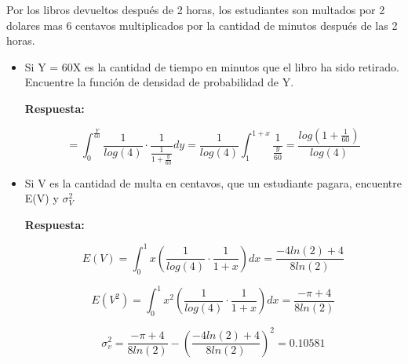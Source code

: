 \documentclass{article}\usepackage[]{graphicx}\usepackage[]{color}
\begin{document}
Por los libros devueltos después de 2 horas, los estudiantes son multados por 2 dolares mas 6 centavos multiplicados por la cantidad de minutos después de las 2 horas.
\begin{itemize}
\item Si Y = 60X es la cantidad de tiempo en minutos que el libro ha sido retirado. Encuentre la función de densidad de probabilidad de Y.

\textbf{Respuesta:}

\[=\int_{0}^{\frac{Y}{60}}\frac{1}{log(4)}\cdot \frac{1}{\frac{1}{1+\frac{y}{60}}}dy=\frac{1}{log(4)}\int_{1}^{1+x}\frac{1}{\frac{y}{60}}=\frac{log(1+\frac{1}{60})}{log(4)}\]

\item Si V es la cantidad de multa en centavos, que un estudiante pagara, encuentre E(V) y $\sigma ^{2}_{V}$

\textbf{Respuesta:}

\[E(V) = \int_{0}^{1}x(\frac{1}{log(4)}\cdot \frac{1}{1+x})dx = \frac{-4ln(2)+4}{8ln(2)}\]

\[E(V^{2}) = \int_{0}^{1}x^{2}(\frac{1}{log(4)}\cdot \frac{1}{1+x})dx = \frac{-\pi +4}{8ln(2)}\]

\[\sigma ^{2}_{v} = \frac{-\pi +4}{8ln(2)}-(\frac{-4ln(2)+4}{8ln(2)})^{2} = 0.10581\]





\end{itemize}


 
\end{document}
